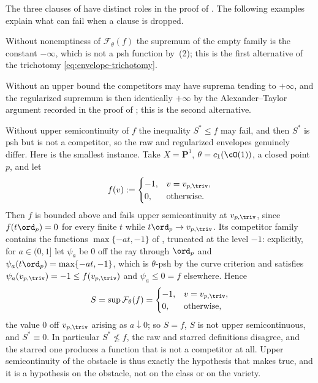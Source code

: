 \begin{remark}
\label{rem:ch45-admissibility}
The three clauses of  have distinct roles
in the proof of .  The following
examples explain what can fail when a clause is dropped.

Without nonemptiness of $\mathcal F_\theta(f)$ the supremum of the empty family
is the constant $-\infty$, which is not a psh function by
\,(2); this is the first alternative of the trichotomy
\eqref{eq:envelope-trichotomy}.

Without an upper bound the competitors may have suprema tending to
$+\infty$, and the regularized supremum is then identically $+\infty$ by
the Alexander--Taylor argument recorded in the proof of
; this is the second alternative.

Without upper semicontinuity of $f$ the inequality $S^*\le f$ may fail,
and then $S^*$ is psh but is not a competitor, so the raw and regularized
envelopes genuinely differ.  Here is the smallest instance.  Take
$X=\mathbf P^1$, $\theta=c_1(\cO(1))$, a closed point $p$, and let
\[
 f(v):=\begin{cases}-1,& v=v_{p,\triv},\\ 0,&\text{otherwise.}\end{cases}
\]
Then $f$ is bounded above and fails upper semicontinuity at
$v_{p,\triv}$, since $f(t\ord_p)=0$ for every finite $t$ while
$t\ord_p\to v_{p,\triv}$.  Its competitor family contains the functions
$\max\{-at,-1\}$ of , truncated at the level
$-1$: explicitly, for $a\in(0,1]$ let $\psi_a$ be $0$ off the ray
through $\ord_p$ and $\psi_a(t\ord_p)=\max\{-at,-1\}$, which is
$\theta$-psh by the curve criterion and satisfies
$\psi_a(v_{p,\triv})=-1\le f(v_{p,\triv})$ and $\psi_a\le0=f$ elsewhere.
Hence
\[
 S=\sup\mathcal F_\theta(f)=\begin{cases}-1,& v=v_{p,\triv},\\ 0,&\text{otherwise,}\end{cases}
\]
the value $0$ off $v_{p,\triv}$ arising as $a\downarrow0$; so
$S=f$, $S$ is not upper semicontinuous, and $S^*\equiv0$.  In
particular $S^*\not\le f$, the raw and starred definitions disagree, and
the starred one produces a function that is not a competitor at all.  Upper
semicontinuity of the obstacle is thus exactly the hypothesis that makes
 true, and it is a hypothesis on the
obstacle, not on the class or on the variety.
\end{remark}


